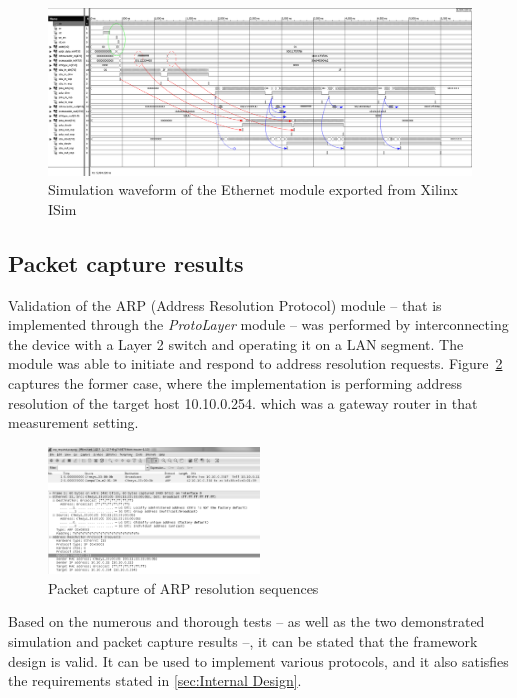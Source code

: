 \documentclass[conference]{IEEEtran}
\begin{document}
\begin{figure}[!htb]
    \centering
    \includegraphics[width=1\textwidth]{figures_raw/ether_tst_wave_annotated.png}
    \caption{Simulation waveform of the Ethernet module exported from Xilinx ISim}
    \label{fig:eth_sim}
\end{figure}

\subsection{Packet capture results}

Validation of the ARP (Address Resolution Protocol) module -- that is implemented through the \emph{ProtoLayer} module
-- was performed by interconnecting the device with a Layer 2 switch and operating it on a LAN segment. The module was
able to initiate and respond to address resolution requests. Figure~\ref{fig:pcap_arp_seq} captures the former case,
where the implementation is performing address resolution of the target host 10.10.0.254. which was a gateway router in
that measurement setting.

\begin{figure}[!htb]
    \centering
    \includegraphics[width=0.5\textwidth]{figures_raw/arp_transaction.png}
    \caption{Packet capture of ARP resolution sequences}
    \label{fig:pcap_arp_seq}
\end{figure}

Based on the numerous and thorough tests -- as well as the two demonstrated simulation and packet capture results --,
it can be stated that the framework design is valid. It can be used to implement various protocols, and it also
satisfies the requirements stated in \ref{sec:Internal Design}.
\end{document}
